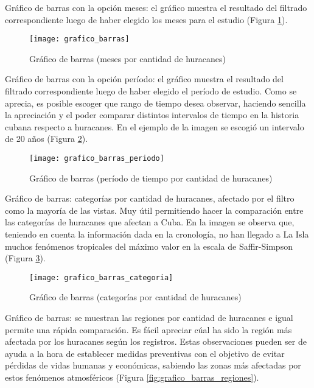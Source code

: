 Gráfico de barras con la opción meses: el gráfico muestra el resultado del filtrado correspondiente luego de haber elegido los meses para el estudio (Figura \ref{fig:grafico_barras}). %

\begin{figure}[H]
\centering
\texttt{[image: grafico\_barras]}
\caption{Gráfico de barras (meses por cantidad de huracanes)}
\label{fig:grafico_barras}
\end{figure}

\pagebreak


Gráfico de barras con la opción período: el gráfico muestra el resultado del filtrado correspondiente luego de haber elegido el período de estudio. Como se aprecia, es posible escoger que rango de tiempo desea observar, haciendo sencilla la apreciación y el poder comparar distintos intervalos de tiempo en la historia cubana respecto a huracanes. En el ejemplo de la imagen se escogió un intervalo de 20 años (Figura \ref{fig:grafico_barras_periodo}).

\begin{figure}[H]
\centering
\texttt{[image: grafico\_barras\_periodo]}
\caption{Gráfico de barras (período de tiempo por cantidad de huracanes)}
\label{fig:grafico_barras_periodo}
\end{figure}

\pagebreak

Gráfico de barras: categorías por cantidad de huracanes, afectado por el filtro como la mayoría de las vistas. Muy útil permitiendo hacer la comparación entre las categorías de huracanes que afectan a Cuba. En la imagen se observa que, teniendo en cuenta la información dada en la cronología, no han llegado a La Isla muchos fenómenos tropicales del máximo valor en la escala de Saffir-Simpson (Figura \ref{fig:grafico_barras_categoria}).

\begin{figure}[H]
\centering
\texttt{[image: grafico\_barras\_categoria]}
\caption{Gráfico de barras (categorías por cantidad de huracanes)}
\label{fig:grafico_barras_categoria}
\end{figure}

\pagebreak

Gráfico de barras: se muestran las regiones por cantidad de huracanes e igual permite una rápida comparación. Es fácil apreciar cúal ha sido la región más afectada por los huracanes según los registros. Estas observaciones pueden ser de ayuda a la hora de establecer medidas preventivas con el objetivo de evitar pérdidas de vidas humanas y económicas, sabiendo las zonas más afectadas por estos fenómenos atmosféricos (Figura \ref{fig:grafico_barras_regiones}).

